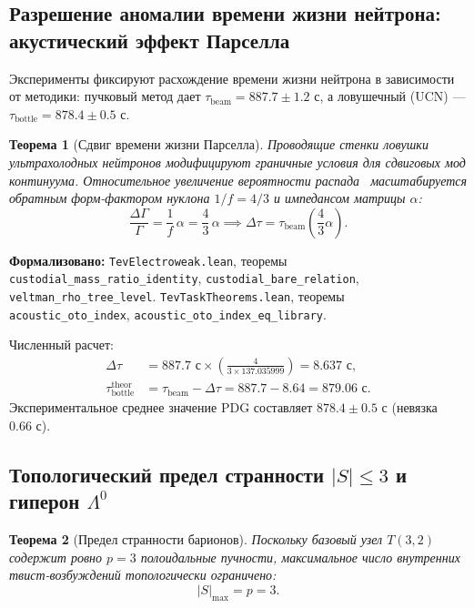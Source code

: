 \documentclass[11pt,a4paper]{article}
\newtheorem{theorem}{Теорема}
\theoremstyle{definition}
\theoremstyle{remark}
\begin{document}
\subsection{Разрешение аномалии времени жизни нейтрона: акустический эффект Парселла}

Эксперименты фиксируют расхождение времени жизни нейтрона в зависимости от методики: пучковый метод дает $\tau_{\mathrm{beam}} = 887.7 \pm 1.2\text{ с}$, а ловушечный (UCN) — $\tau_{\mathrm{bottle}} = 878.4 \pm 0.5\text{ с}$.
	
\begin{theorem}[Сдвиг времени жизни Парселла]
\label{thm:purcell_lifetime_shift}
Проводящие стенки ловушки ультрахолодных нейтронов модифицируют граничные условия для сдвиговых мод континуума. Относительное увеличение вероятности распада~\cite{Purcell1946} масштабируется обратным форм-фактором нуклона $1/f = 4/3$ и импедансом матрицы $\alpha$:
\begin{equation}
	\frac{\Delta \Gamma}{\Gamma} = \frac{1}{f} \, \alpha = \frac{4}{3} \, \alpha \implies \Delta \tau = \tau_{\mathrm{beam}} \left( \frac{4}{3}\alpha \right).
\label{eq:purcell_tau_shift}
\end{equation}
\end{theorem}

\noindent\small\textbf{Формализовано:} \texttt{TevElectroweak.lean}, теоремы \texttt{custodial_mass_ratio_identity}, \texttt{custodial_bare_relation}, \texttt{veltman_rho_tree_level}. \texttt{TevTaskTheorems.lean}, теоремы \texttt{acoustic\_oto\_index}, \texttt{acoustic\_oto\_index\_eq\_library}.

Численный расчет:
\begin{align}
	\Delta \tau &= 887.7\text{ с} \times \left( \frac{4}{3 \times 137.035999} \right) = 8.637\text{ с}, \\
	\tau_{\mathrm{bottle}}^{\mathrm{theor}} &= \tau_{\mathrm{beam}} - \Delta \tau = 887.7 - 8.64 = 879.06\text{ с}.
\label{eq:tau_bottle_prediction}
\end{align}
Экспериментальное среднее значение PDG составляет $878.4 \pm 0.5\text{ с}$ (невязка $0.66\text{ с}$).
	
\subsection{Топологический предел странности $|S| \le 3$ и гиперон $\Lambda^0$}
	
\begin{theorem}[Предел странности барионов]
\label{thm:strangeness_limit_three}
Поскольку базовый узел $T(3,2)$ содержит ровно $p=3$ полоидальные пучности, максимальное число внутренних твист-возбуждений топологически ограничено:
\begin{equation}
	|S|_{\mathrm{max}} = p = 3.
\label{eq:strangeness_bound_exact}
\end{equation}
\end{theorem}
\end{document}
